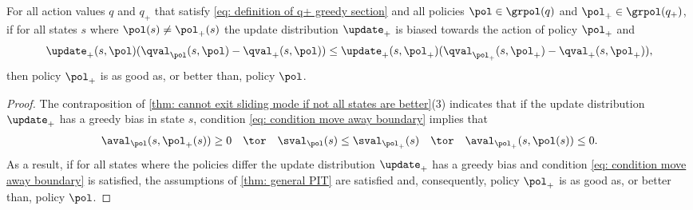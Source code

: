 \begin{lemma}
For all action values $q$ and $q_+$ that satisfy \eqref{eq: definition of q+ greedy section} and all policies $\pol \in \grpol(q)$ and $\pol_+ \in \grpol(q_+)$,
if for all states $s$ where $\pol(s) \neq \pol_+(s)$ the update distribution $\update_+$ is biased towards the action of policy $\pol_+$ and
\begin{equation}
\label{eq: condition move away boundary}
    \update_+(s, \pol) (\qval_{\pol}(s, \pol) - \qval_+(s, \pol))
    \leq
    \update_+(s, \pol_+) (\qval_{\pol_+}(s, \pol_+) - \qval_+(s, \pol_+)) ,
\end{equation}
then policy $\pol_+$ is as good as, or better than, policy $\pol$.
\end{lemma}
\begin{proof}
The contraposition of \autoref{thm: cannot exit sliding mode if not all states are better}(3) indicates that
if the update distribution $\update_+$ has a greedy bias in state $s$, condition \eqref{eq: condition move away boundary} implies that
\begin{align}
    \aval_{\pol}(s, \pol_+(s)) \geq 0
    \quad \tor \quad 
    \sval_{\pol}(s) \leq \sval_{\pol_+}(s)
    \quad \tor \quad 
    \aval_{\pol_+}(s, \pol(s)) \leq 0 .
\end{align}
As a result, if for all states where the policies differ the update distribution $\update_+$ has a greedy bias and condition \eqref{eq: condition move away boundary} is satisfied, the assumptions of \autoref{thm: general PIT} are satisfied and, consequently, policy $\pol_+$ is as good as, or better than, policy $\pol$.
\end{proof}